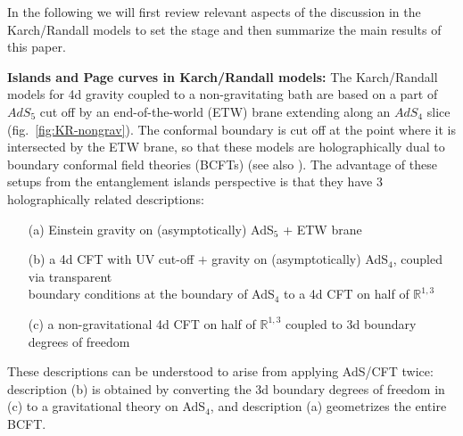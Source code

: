 \documentclass[aps,prd,11pt,notitlepage,longbibliography,nofootinbib,tightenlines,preprintnumbers]{revtex4-1}
\def\RR{{\mathds{R}}}
\begin{document}
In the following we will first review relevant aspects of the discussion in the Karch/Randall models to set the stage and then summarize the main results of this paper.



\medskip
\textbf{Islands and Page curves in Karch/Randall models:} 
The Karch/Randall models for 4d gravity coupled to a non-gravitating bath 
are based on a part of  $AdS_5$ cut off by an end-of-the-world (ETW) brane extending along an $AdS_4$ slice (fig.~\ref{fig:KR-nongrav}). 
The conformal boundary is cut off at the point where it is intersected by the ETW brane, so that these models are holographically dual to boundary conformal field theories (BCFTs) (see also \cite{Takayanagi:2011zk,Fujita:2011fp}). 
%
The advantage of these setups from the entanglement islands perspective is that they have 3 holographically related descriptions:
\begin{itemize}
	\setlength{\parskip}{0 pt}
	\item[(a)] Einstein gravity on (asymptotically) AdS$_5$ + ETW brane
	\item[(b)] a 4d CFT with UV cut-off $+$ gravity on (asymptotically) AdS$_4$, 
	coupled via transparent\\ boundary conditions at the boundary of AdS$_4$ to a 4d CFT on half of $\RR^{1,3}$
	\item[(c)] a non-gravitational 4d CFT on half of $\RR^{1,3}$ coupled to 3d boundary degrees of freedom
\end{itemize}
These descriptions can be understood to arise from applying AdS/CFT twice: description (b) is obtained by converting the 3d boundary degrees of freedom in (c) to a gravitational theory on AdS$_4$, and description (a) geometrizes the entire BCFT.
\end{document}
